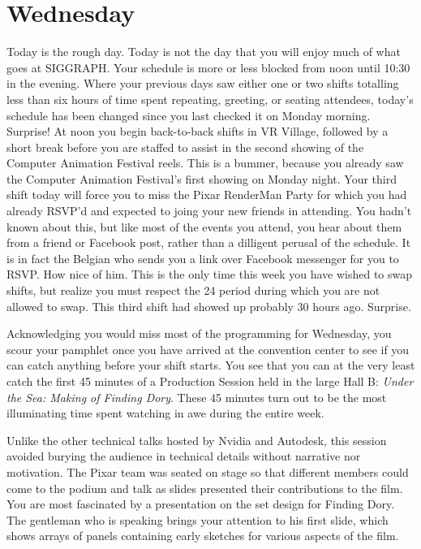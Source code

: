 \documentclass[../main.tex]{subfiles}
\begin{document}
\section{Wednesday}

Today is the rough day. Today is not the day that you will enjoy much of what goes at SIGGRAPH. Your schedule is more or less blocked from noon until 10:30 in the evening. Where your previous days saw either one or two shifts totalling less than six hours of time spent repeating, greeting, or seating attendees, today's schedule has been changed since you last checked it on Monday morning. Surprise! At noon you begin back-to-back shifts in VR Village, followed by a short break before you are staffed to assist in the second showing of the Computer Animation Festival reels. This is a bummer, because you already saw the Computer Animation Festival's first showing on Monday night. Your third shift today will force you to miss the Pixar RenderMan Party for which you had already RSVP'd and expected to joing your new friends in attending. You hadn't known about this, but like most of the events you attend, you hear about them from a friend or Facebook post, rather than a dilligent perusal of the schedule. It is in fact the Belgian who sends you a link over Facebook messenger for you to RSVP. How nice of him. This is the only time this week you have wished to swap shifts, but realize you must respect the 24 period during which you are not allowed to swap. This third shift had showed up probably 30 hours ago. Surprise.

Acknowledging you would miss most of the programming for Wednesday, you scour your pamphlet once you have arrived at the convention center to see if you can catch anything before your shift starts.  You see that you can at the very least catch the first 45 minutes of a Production Session held in the large Hall B: \textit{Under the Sea: Making of Finding Dory}. These 45 minutes turn out to be the most illuminating time spent watching in awe during the entire week.

Unlike the other technical talks hosted by Nvidia and Autodesk, this session avoided burying the audience in technical details without narrative nor motivation. The Pixar team was seated on stage so that different members could come to the podium and talk as slides presented their contributions to the film. You are most fascinated by a presentation on the set design for Finding Dory. The gentleman who is speaking brings your attention to his first slide, which shows arrays of panels containing early sketches for various aspects of the film.
\end{document}

